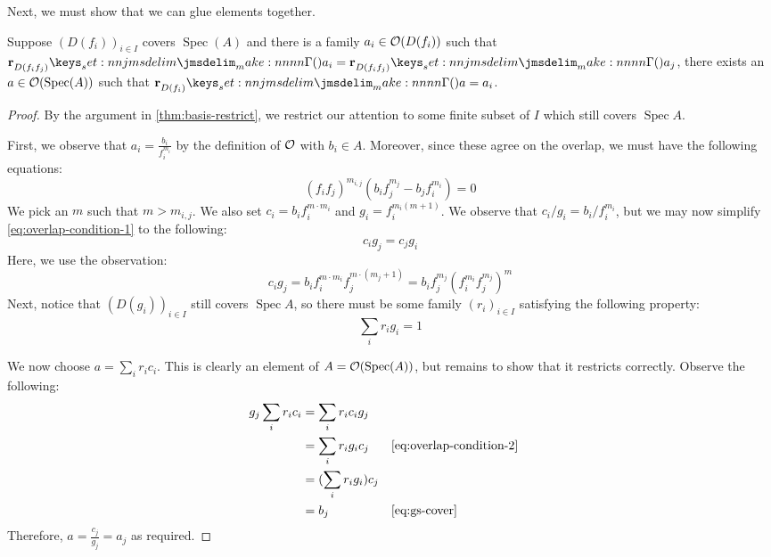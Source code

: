 \documentclass{amsart}
\DeclareMathOperator{\Spec}{Spec}
\begin{document}
Next, we must show that we can glue elements together.
\begin{theorem}
  \label{thm:basis-glue}
  Suppose $(D(f_i))_{i \in I}$ covers $\Spec(A)$ and there is a family $a_i \in \mathcal{O}(D(f_i))$
  such that $\Res{a_i}{D(f_if_j)} = \Res{a_j}{D(f_if_j)}$, there exists an
  $a \in \StructSh(\Spec(A))$ such that $\Res{a}{D(f_i)} = a_i$.
\end{theorem}
\begin{proof}
  By the argument in \cref{thm:basis-restrict}, we restrict our attention to some finite subset of
  $I$ which still covers $\Spec A$.

  First, we observe that $a_i = \frac{b_i}{f_i^{m_i}}$ by the definition of $\mathcal{O}$ with
  $b_i \in A$. Moreover, since these agree on the overlap, we must have the following equations:
  \begin{equation}
    \label{eq:overlap-condition-1}
    (f_if_j)^{m_{i,j}}(b_if_j^{m_j} - b_jf_i^{m_i}) = 0
  \end{equation}
  We pick an $m$ such that $m > m_{i,j}$. We also set $c_i = b_if_i^{m \cdot m_i}$ and
  $g_i = f_i^{m_i (m + 1)}$. We observe that $c_i/g_i = b_i/f_i^{m_i}$, but we may now simplify
  \cref{eq:overlap-condition-1} to the following:
  \begin{equation}
    \label{eq:overlap-condition-2}
    c_ig_j = c_jg_i
  \end{equation}
  Here, we use the observation:
  \[
    c_ig_j = b_if_i^{m \cdot m_i}f_j^{m \cdot (m_j+1)} = b_if_j^{m_j} (f_i^{m_i}f_j^{m_j})^m
  \]
  Next, notice that $(D(g_i))_{i \in I}$ still covers $\Spec A$, so there must be some family
  $(r_i)_{i \in I}$ satisfying the following property:
  \begin{equation}
    \label{eq:gs-cover}
    \sum_i r_ig_i = 1
  \end{equation}

  We now choose $a = \sum_i r_ic_i$. This is clearly an element of $A = \StructSh(\Spec(A))$, but
  remains to show that it restricts correctly. Observe the following:
  \begin{align*}
    g_j \sum_i r_ic_i
    &= \sum_i r_i c_ig_j\\
    &= \sum_i r_i g_i c_j && \text{\cref{eq:overlap-condition-2}}\\
    &= (\sum_i r_i g_i) c_j\\
    &= b_j && \text{\cref{eq:gs-cover}}
  \end{align*}
  Therefore, $a = \frac{c_j}{g_j} = a_j$ as required.
\end{proof}
\end{document}
